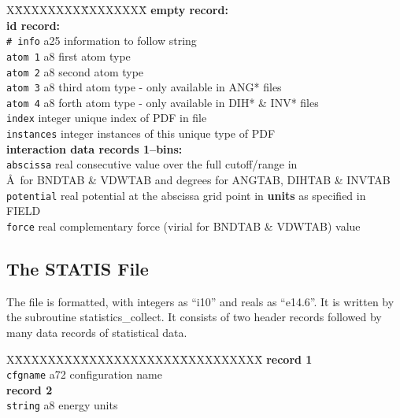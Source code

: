 \begin{tabbing}
X\=XXXXXXXX\=XXXXXXXX\=\kill
{\bf empty record:} \\
{\bf id record:} \\
\> {\tt \# info}   \> a25     \> information to follow string \\
\> {\tt atom 1}    \> a8      \> first atom type \\
\> {\tt atom 2}    \> a8      \> second atom type \\
\> {\tt atom 3}    \> a8      \> third atom type - only available in ANG* files \\
\> {\tt atom 4}    \> a8      \> forth atom type - only available in DIH* \& INV* files \\
\> {\tt index}     \> integer \> unique index of PDF in file \\
\> {\tt instances} \> integer \> instances of this unique type of PDF \\
{\bf interaction data records 1--bins:} \\
\> {\tt abscissa}  \> real \> consecutive value over the full cutoff/range in \\
\>                 \>      \> \AA~for BNDTAB \& VDWTAB and degrees for ANGTAB, DIHTAB \& INVTAB \\
\> {\tt potential} \> real \> potential at the abscissa grid point in {\bf units} as specified in FIELD \\
\> {\tt force}     \> real \> complementary force (virial for BNDTAB \& VDWTAB) value
\end{tabbing}

\subsection{The STATIS File}
\label{statis-file}

The file is formatted, with integers as ``i10'' and reals as
``e14.6''.  It is written by the subroutine {\sc
statistics\_collect}.  It consists of two header records followed
by many data records of statistical data.
\begin{tabbing}
X\=XXXXXXXX\=XXXXXXXXXXXX\=XXXXXXXXXX\=\kill
{\bf record 1} \\
\> {\tt cfgname} \> a72 \> configuration name \\
{\bf record 2} \\
\> {\tt string}  \> a8  \> energy units
\end{tabbing}

